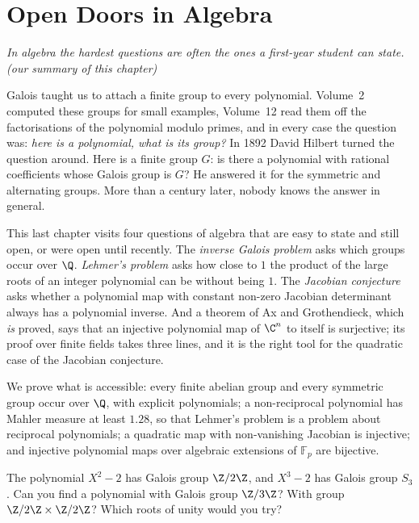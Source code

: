 \chapter{Open Doors in Algebra}\label{conjectures:ch:algebra}

\begin{center}\itshape
In algebra the hardest questions are often the ones a first-year student can state.\\
\upshape(our summary of this chapter)
\end{center}

Galois taught us to attach a finite group to every polynomial. Volume~2 computed these groups for small examples, Volume~12 read them off the
factorisations of the polynomial modulo primes, and in every case the question was: \emph{here is a polynomial, what is its group?} In 1892 David Hilbert
turned the question around. Here is a finite group $G$: is there a polynomial with rational coefficients whose Galois group is $G$? He answered it for the
symmetric and alternating groups. More than a century later, nobody knows the answer in general.

This last chapter visits four questions of algebra that are easy to state and still open, or were open until recently. The \emph{inverse Galois problem}
asks which groups occur over $\Q$. \emph{Lehmer's problem} asks how close to $1$ the product of the large roots of an integer polynomial can be without being
$1$. The \emph{Jacobian conjecture} asks whether a polynomial map with constant non-zero Jacobian determinant always has a polynomial inverse. And a
theorem of Ax and Grothendieck, which \emph{is} proved, says that an injective polynomial map of $\C^n$ to itself is surjective; its proof over finite
fields takes three lines, and it is the right tool for the quadratic case of the Jacobian conjecture.

We prove what is accessible: every finite abelian group and every symmetric group occur over $\Q$, with explicit polynomials; a non-reciprocal polynomial
has Mahler measure at least $1.28$, so that Lehmer's problem is a problem about reciprocal polynomials; a quadratic map with non-vanishing Jacobian is
injective; and injective polynomial maps over algebraic extensions of $\mathbb F_p$ are bijective.

\begin{think}
The polynomial $X^2-2$ has Galois group $\Z/2\Z$, and $X^3-2$ has Galois group $S_3$. Can you find a polynomial with Galois group $\Z/3\Z$? With group
$\Z/2\Z\times\Z/2\Z$? Which roots of unity would you try?
\end{think}

